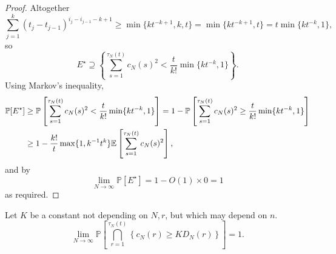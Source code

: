 \documentclass{article}
\newcommand{\Prob}{\mathbb{P}}
\newcommand{\E}{\mathbb{E}}
\newcommand{\1}[1]{\mathbbm{1}_{#1}}
\begin{document}
\begin{proof}
Altogether
\begin{equation}
\sum_{j=1}^k (t_j - t_{j-1})^{i_j - i_{j-1} -k +1}
\geq \min\{ kt^{-k+1}, k, t \}
= \min\{ kt^{-k+1}, t \}
= t \min\{ kt^{-k}, 1 \} ,
\end{equation}
so
\begin{equation}
E^\star
\supseteq \left\{ \sum_{s=1}^{\tau_N(t)} c_N(s)^2 < 
        \frac{t}{k!} \min\{ kt^{-k}, 1 \} \right\} .
\end{equation}
Using Markov's inequality,
\begin{align}
\Prob[E^\star]
&\geq \Prob \left[ \sum_{s=1}^{\tau_N(t)} c_N(s)^2 < 
        \frac{t}{k!} \min\{ kt^{-k}, 1 \} \right]
= 1- \Prob \left[ \sum_{s=1}^{\tau_N(t)} c_N(s)^2 \geq 
        \frac{t}{k!} \min\{ kt^{-k}, 1 \} \right] \notag\\
&\geq 1- \frac{k!}{t} \max\{ 1, k^{-1} t^k \} 
        \E \left[  \sum_{s=1}^{\tau_N(t)} c_N(s)^2 \right] ,
\end{align}
and by \citet[Equation (3.5)]{brown2021}
\begin{equation}
\lim_{N\to\infty} \Prob[E^\star]
= 1 - O(1) \times 0 
= 1
\end{equation}
as required.
\end{proof}


\begin{lemma}
Let $K$ be a constant not depending on $N, r$, but which may depend on $n$.
\begin{equation}
\lim_{N\to\infty} \Prob \left[ \bigcap_{r=1}^{\tau_N(t)} 
        \left\{ c_N(r) \geq K D_N(r) \right\} \right] 
= 1 . 
\end{equation}
\end{lemma}
\end{document}
